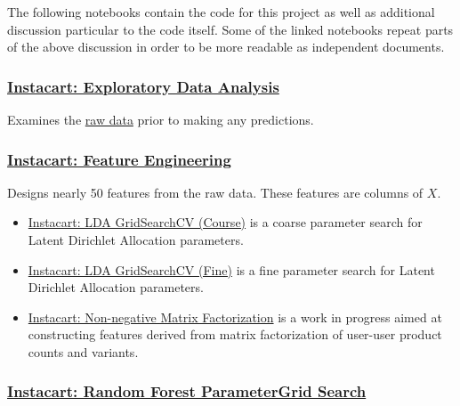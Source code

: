 \documentclass[11pt]{article}
\providecommand{\tightlist}{%
      \setlength{\itemsep}{0pt}\setlength{\parskip}{0pt}}
\theoremstyle{definition}
\numberwithin{equation}{section}
\begin{document}
The following notebooks contain the code for this project as well as
additional discussion particular to the code itself. Some of the linked
notebooks repeat parts of the above discussion in order to be more
readable as independent documents.

\hypertarget{instacart-exploratory-data-analysis}{%
  \subsubsection{\texorpdfstring{\href{./instacart-exploratory-data-analysis.ipynb}{Instacart:
        Exploratory Data
        Analysis}}{Instacart: Exploratory Data Analysis}}\label{instacart-exploratory-data-analysis}}

Examines the
\href{https://www.kaggle.com/c/instacart-market-basket-analysis/data}{raw
  data} prior to making any predictions.

\hypertarget{instacart-feature-engineering}{%
  \subsubsection{\texorpdfstring{\href{./instacart-feature-engineering.ipynb}{Instacart:
        Feature
        Engineering}}{Instacart: Feature Engineering}}\label{instacart-feature-engineering}}

Designs nearly 50 features from the raw data. These features are columns
of \(X\).

\begin{itemize}
  \tightlist
  \item
        \href{./instacart-lda-gridsearchcv-course}{Instacart: LDA GridSearchCV
          (Course)} is a coarse parameter search for Latent Dirichlet Allocation
        parameters.
  \item
        \href{./instacart-lda-gridsearchcv-fine}{Instacart: LDA GridSearchCV
          (Fine)} is a fine parameter search for Latent Dirichlet Allocation
        parameters.
  \item
        \href{./instacart-non-negative-matrix-factorization}{Instacart:
          Non-negative Matrix Factorization} is a work in progress aimed at
        constructing features derived from matrix factorization of user-user
        product counts and variants.
\end{itemize}

\hypertarget{instacart-random-forest-parametergrid-search}{%
  \subsubsection{\texorpdfstring{\href{./instacart-random-forest-parametergrid-search.ipynb}{Instacart:
        Random Forest ParameterGrid
        Search}}{Instacart: Random Forest ParameterGrid Search}}\label{instacart-random-forest-parametergrid-search}}
\end{document}
